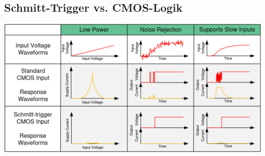 \subsection{Schmitt-Trigger vs. CMOS-Logik}

\includegraphics[width=\columnwidth]{images/benefits_schmitt-trigger.png}

